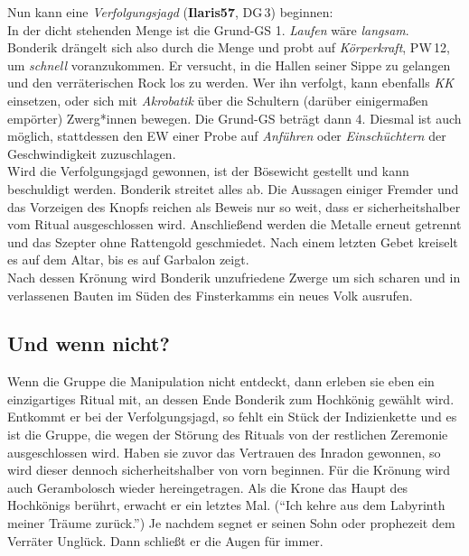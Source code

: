 \documentclass[openright]{Ilaris}
\begin{document}
Nun kann eine \emph{Verfolgungsjagd} (\textbf{Ilaris57}, DG\,3) beginnen:\\
In der dicht stehenden Menge ist die Grund-GS 1. \emph{Laufen} wäre \emph{langsam}.
Bonderik drängelt sich also durch die Menge und probt auf \emph{Körperkraft}, PW\,12, um \emph{schnell} voranzukommen. Er versucht, in die Hallen seiner Sippe zu gelangen und den verräterischen Rock los zu werden.
Wer ihn verfolgt, kann ebenfalls \emph{KK} einsetzen, oder sich mit \emph{Akrobatik} über die Schultern (darüber einigermaßen empörter) Zwerg*innen bewegen. Die Grund-GS beträgt dann 4. Diesmal ist auch möglich, stattdessen den EW einer Probe auf \emph{Anführen} oder \emph{Einschüchtern} der Geschwindigkeit zuzuschlagen.\\
Wird die Verfolgungsjagd gewonnen, ist der Bösewicht gestellt und kann beschuldigt werden.
Bonderik streitet alles ab. Die Aussagen einiger Fremder und das Vorzeigen des Knopfs reichen als Beweis nur so weit, dass er sicherheitshalber vom Ritual ausgeschlossen wird. Anschließend werden die Metalle erneut getrennt und das Szepter ohne Rattengold geschmiedet. Nach einem letzten Gebet kreiselt es auf dem Altar, bis es auf Garbalon zeigt.\\
Nach dessen Krönung wird Bonderik unzufriedene Zwerge um sich scharen und in verlassenen Bauten im Süden des Finsterkamms ein neues Volk ausrufen.
\subsection{Und wenn nicht?}
Wenn die Gruppe die Manipulation nicht entdeckt, dann erleben sie eben ein einzigartiges Ritual mit, an dessen Ende Bonderik zum Hochkönig gewählt wird.
Entkommt er bei der Verfolgungsjagd, so fehlt ein Stück der Indizienkette und es ist die Gruppe, die wegen der Störung des Rituals von der restlichen Zeremonie ausgeschlossen wird.
Haben sie zuvor das Vertrauen des Inradon gewonnen, so wird dieser dennoch sicherheitshalber von vorn beginnen.
Für die Krönung wird auch Gerambolosch wieder hereingetragen. Als die Krone das Haupt des Hochkönigs berührt, erwacht er ein letztes Mal. (\enquote{Ich kehre aus dem Labyrinth meiner Träume zurück.}) Je nachdem segnet er seinen Sohn oder prophezeit dem Verräter Unglück.
Dann schließt er die Augen für immer.

\spaltenende
{}
\spaltenanfang
\end{document}

